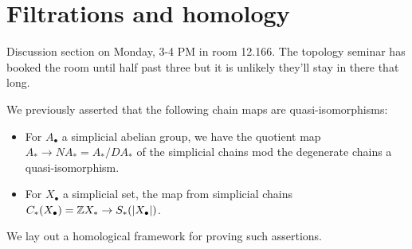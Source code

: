 \section{Filtrations and homology} 
Discussion section on Monday, 3-4 PM in room 12.166. The topology seminar has booked the room until half past three but it is unlikely they'll stay in there that long.

We previously asserted that the following chain maps are quasi-isomorphisms:
\begin{itemize}
\setlength\itemsep{-.2em}
    \item For $A_{\bullet}$ a simplicial abelian group, we have the quotient map $A_* \to NA_*=A_* / DA_*$ of the simplicial chains mod the degenerate chains a quasi-isomorphism.
    \item For $X_{\bullet }$ a simplicial set, the map from simplicial chains $C_*(X_{\bullet})=\mathbb{Z} X_* \to S_*(|X_{\bullet}|)$. 
\end{itemize}We lay out a homological framework for proving such assertions.
